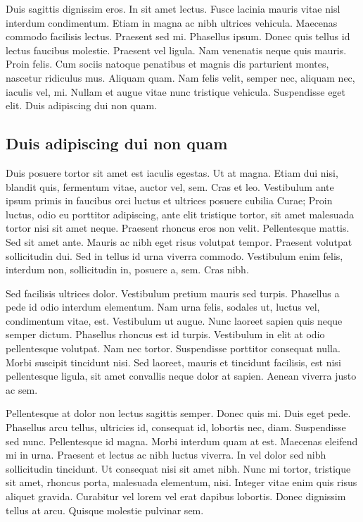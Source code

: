 \documentclass[../hdr.tex]{subfiles}
\begin{document}
Duis sagittis dignissim eros. In sit amet lectus. Fusce lacinia mauris vitae
nisl interdum condimentum. Etiam in magna ac nibh ultrices vehicula. Maecenas
commodo facilisis lectus. Praesent sed mi. Phasellus ipsum. Donec quis tellus id
lectus faucibus molestie. Praesent vel ligula. Nam venenatis neque quis mauris.
Proin felis. Cum sociis natoque penatibus et magnis dis parturient montes,
nascetur ridiculus mus. Aliquam quam. Nam felis velit, semper nec, aliquam nec,
iaculis vel, mi. Nullam et augue vitae nunc tristique vehicula. Suspendisse eget
elit. Duis adipiscing dui non quam.

\subsection{Duis adipiscing dui non quam}

Duis posuere tortor sit amet est iaculis egestas. Ut at magna. Etiam dui nisi,
blandit quis, fermentum vitae, auctor vel, sem. Cras et leo. Vestibulum ante
ipsum primis in faucibus orci luctus et ultrices posuere cubilia Curae; Proin
luctus, odio eu porttitor adipiscing, ante elit tristique tortor, sit amet
malesuada tortor nisi sit amet neque. Praesent rhoncus eros non velit.
Pellentesque mattis. Sed sit amet ante. Mauris ac nibh eget risus volutpat
tempor. Praesent volutpat sollicitudin dui. Sed in tellus id urna viverra
commodo. Vestibulum enim felis, interdum non, sollicitudin in, posuere a, sem.
Cras nibh.

Sed facilisis ultrices dolor. Vestibulum pretium mauris sed turpis. Phasellus a
pede id odio interdum elementum. Nam urna felis, sodales ut, luctus vel,
condimentum vitae, est. Vestibulum ut augue. Nunc laoreet sapien quis neque
semper dictum. Phasellus rhoncus est id turpis. Vestibulum in elit at odio
pellentesque volutpat. Nam nec tortor. Suspendisse porttitor consequat nulla.
Morbi suscipit tincidunt nisi. Sed laoreet, mauris et tincidunt facilisis, est
nisi pellentesque ligula, sit amet convallis neque dolor at sapien. Aenean
viverra justo ac sem.

Pellentesque at dolor non lectus sagittis semper. Donec quis mi. Duis eget pede.
Phasellus arcu tellus, ultricies id, consequat id, lobortis nec, diam.
Suspendisse sed nunc. Pellentesque id magna. Morbi interdum quam at est.
Maecenas eleifend mi in urna. Praesent et lectus ac nibh luctus viverra. In vel
dolor sed nibh sollicitudin tincidunt. Ut consequat nisi sit amet nibh. Nunc mi
tortor, tristique sit amet, rhoncus porta, malesuada elementum, nisi. Integer
vitae enim quis risus aliquet gravida. Curabitur vel lorem vel erat dapibus
lobortis. Donec dignissim tellus at arcu. Quisque molestie pulvinar sem.
\end{document}
